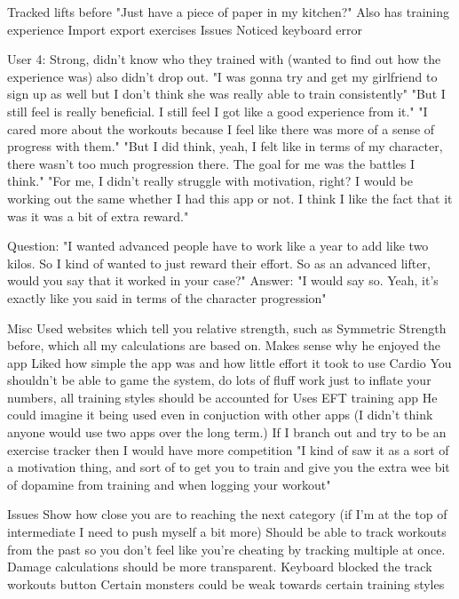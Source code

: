 \documentclass{l4proj}
\begin{document}
  Tracked lifts before "Just have a piece of paper in my kitchen?" Also has training experience
  Import export exercises
  Issues
    Noticed keyboard error






User 4: Strong, didn't know who they trained with (wanted to find out how the experience was) also didn't drop out. 
  "I was gonna try and get my girlfriend to sign up as well but I don't think she was really able to train consistently"
  "But I still feel is really beneficial. I still feel I got like a good experience from it."
  "I cared more about the workouts because I feel like there was more of a sense of progress with them."
  "But I did think, yeah, I felt like in terms of my character, there wasn't too much progression there. The goal for me was the battles I think." 
  "For me, I didn't really struggle with motivation, right? I would be working out the same whether I had this app or not. I think I like the fact that it was it was a bit of extra reward."

  Question: "I wanted advanced people have to work like a year to add like two kilos. So I kind of wanted to just reward their effort. So as an advanced lifter, would you say that it worked in your case?"
    Answer: "I would say so. Yeah, it's exactly like you said in terms of the character progression"

  Misc
    Used websites which tell you relative strength, such as Symmetric Strength before, which all my calculations are based on. Makes sense why he enjoyed the app
    Liked how simple the app was and how little effort it took to use
    Cardio 
    You shouldn't be able to game the system, do lots of fluff work just to inflate your numbers, all training styles should be accounted for 
    Uses EFT training app
    He could imagine it being used even in conjuction with other apps (I didn't think anyone would use two apps over the long term.)
    If I branch out and try to be an exercise tracker then I would have more competition
    "I kind of saw it as a sort of a motivation thing, and sort of to get you to train and give you the extra wee bit of dopamine from training and when logging your workout"

  Issues
    Show how close you are to reaching the next category (if I'm at the top of intermediate I need to push myself a bit more)
    Should be able to track workouts from the past so you don't feel like you're cheating by tracking multiple at once.
    Damage calculations should be more transparent.
    Keyboard blocked the track workouts button
    Certain monsters could be weak towards certain training styles
\end{document}
